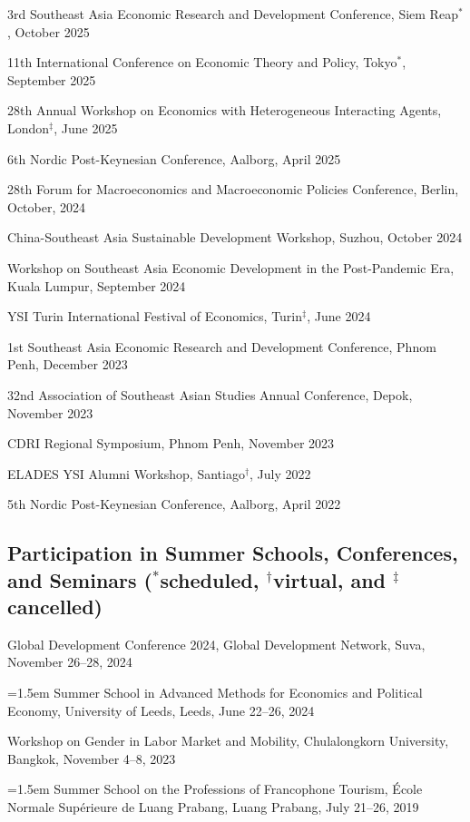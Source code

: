 \documentclass[10pt,a4paper]{article}
\begin{document}
3rd Southeast Asia Economic Research and Development Conference, Siem Reap$^\ast$, October 2025

11th International Conference on Economic Theory and Policy, Tokyo$^\ast$, September 2025

28th Annual Workshop on Economics with Heterogeneous Interacting Agents, London$^\ddag$, June 2025

6th Nordic Post-Keynesian Conference, Aalborg, April 2025

28th Forum for Macroeconomics and Macroeconomic Policies Conference, Berlin, October, 2024

China-Southeast Asia Sustainable Development Workshop, Suzhou, October 2024

Workshop on Southeast Asia Economic Development in the Post-Pandemic Era, Kuala Lumpur, September 2024

YSI Turin International Festival of Economics, Turin$^\ddag$, June 2024

1st Southeast Asia Economic Research and Development Conference, Phnom Penh, December 2023

32nd Association of Southeast Asian Studies Annual Conference, Depok, November 2023

CDRI Regional Symposium, Phnom Penh, November 2023

ELADES YSI Alumni Workshop, Santiago$^\dag$, July 2022

5th Nordic Post-Keynesian Conference, Aalborg, April 2022

\subsection*{Participation in Summer Schools, Conferences, and Seminars ($^\ast$scheduled, $^\dag$virtual, and $^\ddag$cancelled)}

Global Development Conference 2024, Global Development Network, Suva, November 26--28, 2024 

\hangindent=1.5em
Summer School in Advanced Methods for Economics and Political Economy, University of Leeds, Leeds, June 22--26, 2024

Workshop on Gender in Labor Market and Mobility, Chulalongkorn University, Bangkok, November 4--8, 2023

\hangindent=1.5em
Summer School on the Professions of Francophone Tourism, École Normale Supérieure de Luang Prabang, Luang Prabang, July 21–26, 2019
\end{document}
